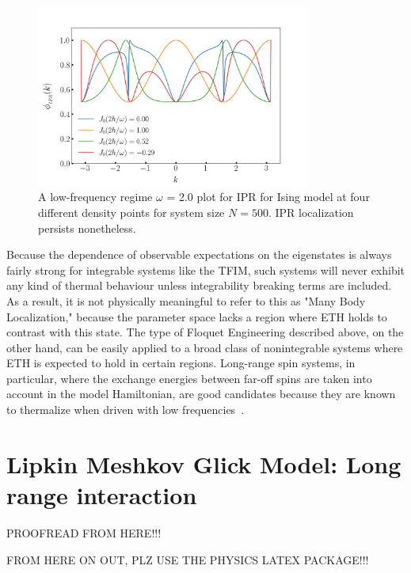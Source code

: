 \documentclass[%
reprint,
superscriptaddress,
amsmath,amssymb,
aps,
prb,
]{revtex4-2}
\begin{document}
	
	\begin{figure}[]
		\centering
		\includegraphics[height = 6cm, width =9cm]{low_frq_exactN500_ipr.jpeg}
		\caption{A low-frequency regime $\omega$ = 2.0 plot for IPR for Ising model at four different density points for system size $N = 500$. IPR localization persists nonetheless.}
		\label{fig:ipr:isinglowfrk}
	\end{figure}
	
	Because the dependence of observable expectations on the eigenstates is always fairly strong for integrable systems like the TFIM, such systems will never exhibit any kind of thermal behaviour unless integrability breaking terms are included. As a result, it is not physically meaningful to refer to this as "Many Body Localization," because the parameter space lacks a region where ETH holds to contrast with this state. The type of Floquet Engineering described above, on the other hand, can be easily applied to a broad class of nonintegrable systems where ETH is expected to hold in certain regions. Long-range spin systems, in particular, where the exchange energies between far-off spins are taken into account in the model Hamiltonian, are good candidates because they are known to thermalize when driven with low frequencies~\cite{russomanno_thermalization_2015}.
	\section{\label{sec:level3}Lipkin Meshkov Glick Model: Long range interaction}
	
	PROOFREAD FROM HERE!!!
	
	FROM HERE ON OUT, PLZ USE THE PHYSICS LATEX PACKAGE!!!
	
\end{document}
